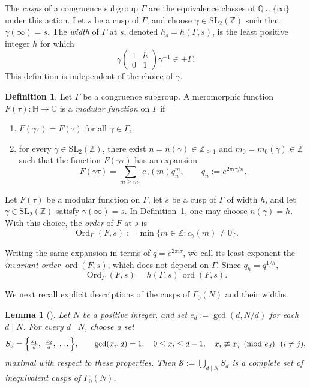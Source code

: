 \documentclass{amsart}
\newtheorem{lemma}[theorem]{Lemma}
\theoremstyle{definition}
\newtheorem{definition}[theorem]{Definition}
\newcommand{\smat}[4]{\left(\begin{smallmatrix}#1&#2\\#3&#4\end{smallmatrix}\right)}
\DeclareMathOperator{\ord}{ord}
\DeclareMathOperator{\Ord}{Ord}
\begin{document}
{{The \emph{cusps} of a congruence subgroup $\Gamma$ are the
equivalence classes of $\mathbb{Q}\cup\{\infty\}$ under this action.
Let $s$ be a cusp of $\Gamma$, and choose
$\gamma\in\mathrm{SL}_{2}(\mathbb{Z})$ such that
$\gamma(\infty)=s$. The \emph{width} of $\Gamma$ at $s$, denoted
$h_{s}=h(\Gamma,s)$, is the least positive integer $h$ for which
\begin{equation*}
\gamma\smat{1}{h}{0}{1}\gamma^{-1}\in\pm\Gamma.
\end{equation*}
This definition is independent of the choice of $\gamma$.

\begin{definition}\label{def.modfn}
Let $\Gamma$ be a congruence subgroup. A meromorphic function
$F(\tau)\colon\mathbb{H}\to\mathbb{C}$ is a \emph{modular function}
on $\Gamma$ if
\begin{enumerate}
\item 
$F(\gamma\tau)=F(\tau)$ for all $\gamma\in\Gamma$,
\item for 
every $\gamma\in\mathrm{SL}_{2}(\mathbb{Z})$, there exist $n=n(\gamma)\in\mathbb{Z}_{\ge 1}$ and $m_0=m_0(\gamma)\in\mathbb{Z}$ such that the function $F(\gamma\tau)$ has an
expansion
\begin{equation*}
F(\gamma\tau)
=\sum_{m\geq m_0}c_{\gamma}(m)q_n^m,
\qquad
q_n:=e^{2\pi i\tau/n}.
\end{equation*}
\end{enumerate}
\end{definition}

Let $F(\tau)$ be a modular function on $\Gamma$,
let $s$ be a cusp of $\Gamma$ of width $h$, and let
$\gamma\in\mathrm{SL}_{2}(\mathbb{Z})$ satisfy $\gamma(\infty)=s$.
In Definition~\ref{def.modfn}, one may choose $n(\gamma)=h$.
With this choice, the \emph{order} of $F$
at $s$ is
\begin{equation*}
\Ord_{\Gamma}(F,s)
:=\min\{m\in\mathbb{Z}:c_{\gamma}(m)\neq0\}.
\end{equation*}

Writing the same expansion in terms of $q=e^{2\pi i\tau}$, we call
its least exponent the \emph{invariant order} $\ord(F,s)$, which does not depend on $\Gamma$. Since
$q_h=q^{1/h}$,
\begin{equation}\label{eq.twoorders}
\Ord_{\Gamma}(F,s)
=h(\Gamma,s)\,\ord(F,s).
\end{equation}


We next recall explicit descriptions of the cusps of $\Gamma_{0}(N)$
and their widths.

\begin{lemma}[{\cite[p.~354]{CL2004}}]\label{lem.cusps}
Let $N$ be a positive integer, and set $e_{d}:=\gcd(d,N/d)$ for each
$d\mid N$. For every $d\mid N$, choose a set
\begin{equation*}
S_{d}=\Bigl\{\tfrac{x_{1}}{d},\ \tfrac{x_{2}}{d},\ \dots\Bigr\},
\qquad
\gcd(x_{i},d)=1,\quad 0\le x_{i}\le d-1,\quad
x_{i}\not\equiv x_{j}\pmod{e_{d}}\ \ (i\neq j),
\end{equation*}
maximal with respect to these properties. Then
$\mathcal{S}:=\bigcup_{d\mid N}S_{d}$ is a complete set of
inequivalent cusps of $\Gamma_{0}(N)$.
\end{lemma}

}}
\end{document}
